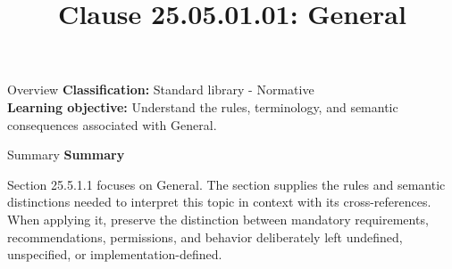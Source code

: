 \documentclass[10pt,letterpaper]{article}
\title{Clause 25.05.01.01: General}
\author{}
\date{}
\begin{document}
\maketitle
\begin{CornellOverviewBox}{Overview}
\textbf{Classification:} Standard library - Normative\\[2pt]
\textbf{Learning objective:} Understand the rules, terminology, and semantic consequences associated with General.
\end{CornellOverviewBox}\begin{CornellSummaryBox}{Summary}
{\sffamily\bfseries\color{Accent} Summary}\par\vspace{3pt}Section 25.5.1.1 focuses on General. The section supplies the rules and semantic distinctions needed to interpret this topic in context with its cross-references. When applying it, preserve the distinction between mandatory requirements, recommendations, permissions, and behavior deliberately left undefined, unspecified, or implementation-defined.
\end{CornellSummaryBox}
\end{document}
